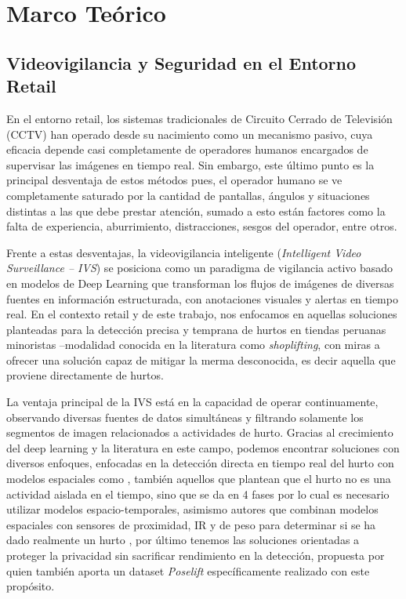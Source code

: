 \section{Marco Teórico}

\subsection{Videovigilancia y Seguridad en el Entorno Retail}

En el entorno retail, los sistemas tradicionales de Circuito Cerrado de
Televisión (CCTV) han operado desde su nacimiento como un mecanismo pasivo,
cuya eficacia depende casi completamente de operadores humanos encargados de
supervisar las imágenes en tiempo real. Sin embargo, este último punto es la
principal desventaja de estos métodos pues, el operador humano se ve
completamente saturado por la cantidad de pantallas, ángulos y situaciones
distintas a las que debe prestar atención, sumado a esto están factores
como la falta de experiencia, aburrimiento, distracciones, sesgos del
operador, entre otros.

Frente a estas desventajas, la videovigilancia inteligente (\textit{Intelligent Video Surveillance -- IVS}) se posiciona como un
paradigma de vigilancia activo basado en modelos de Deep Learning que transforman
los flujos de imágenes de diversas fuentes en información estructurada,
con anotaciones visuales y alertas en tiempo real. En el contexto retail y de este
trabajo, nos enfocamos en aquellas soluciones planteadas para la detección precisa
y temprana de hurtos en tiendas peruanas minoristas --modalidad conocida en la literatura
como \textit{shoplifting}, con miras a ofrecer una solución capaz de mitigar la merma
desconocida, es decir aquella que proviene directamente de hurtos.

La ventaja principal de la IVS está en la capacidad de operar continuamente,
observando diversas fuentes de datos simultáneas y filtrando solamente los segmentos de
imagen relacionados a actividades de hurto. Gracias al crecimiento del deep learning
y la literatura en este campo, podemos encontrar soluciones con diversos enfoques, enfocadas en
la detección directa en tiempo real del hurto con modelos espaciales como \cite{aguero_intelligent_2025, hameed_real_2025},
también aquellos que plantean que el hurto no es una actividad aislada en el tiempo, sino que
se da en 4 fases \cite{martinez-mascorro_suspicious_2021, chinthulla_deep_2025} por lo cual es necesario utilizar modelos
espacio-temporales, asimismo autores que combinan modelos espaciales con sensores de proximidad, IR
y de peso para determinar si se ha dado realmente un hurto \cite{m_deep_2023}, por último tenemos las
soluciones orientadas a proteger la privacidad sin sacrificar rendimiento en la detección, propuesta por
\cite{rashvand_exploring_2025} quien también aporta un dataset \textit{Poselift} específicamente realizado con este propósito.

